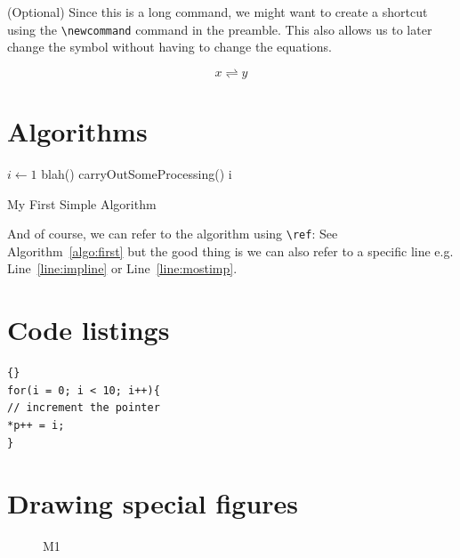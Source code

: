 \documentclass{styles/llncs}
\newcommand{\flow}{\rightleftharpoons}
\begin{document}
(Optional) Since this is a long command, we might want to create a shortcut using the \verb|\newcommand| command in the preamble. This also allows us to later change the symbol without having to change the equations. 

\[ x \flow y \]


\section{Algorithms}

\begin{algorithm}
	\begin{algorithmic}[2]
		\STATE $i\gets1$
		\ELSE 
		 \label{line:impline}
		\STATE blah()
		\STATE carryOutSomeProcessing() \label{line:mostimp}
		\ENDFOR
		\ENDIF
		\ENDIF
		\RETURN i
	\end{algorithmic}
	\caption{My First Simple Algorithm}
	\label{algo:first}
\end{algorithm}

And of course, we can refer to the algorithm using \verb|\ref|: See Algorithm~\ref{algo:first} but the good thing is we can also refer to a specific line e.g. Line~\ref{line:impline} or Line~\ref{line:mostimp}.


\section{Code listings}

\lstset{language=c++}
\lstset{caption=Some C++ Code}
\begin{lstlisting}[frame=single]{}
for(i = 0; i < 10; i++){
// increment the pointer
*p++ = i;
}
\end{lstlisting}


%

\section{Drawing special figures}

\begin{figure}
	\centering
	\caption{M1} \label{fig:M1}
\end{figure}
\end{document}
